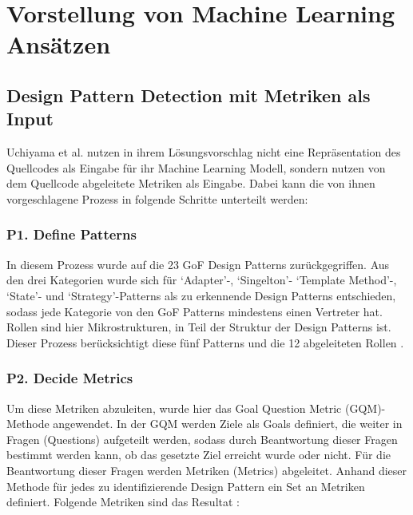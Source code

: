 \documentclass[conference]{IEEEtran}
\begin{document}
\newpage

\section{Vorstellung von Machine Learning Ansätzen}

\subsection{Design Pattern Detection mit Metriken als Input}

Uchiyama et al. nutzen in ihrem Lösungsvorschlag nicht eine Repräsentation des Quellcodes als Eingabe für ihr Machine Learning Modell, sondern nutzen von dem Quellcode abgeleitete Metriken als Eingabe\cite{dodmetrics}.
Dabei kann die von ihnen vorgeschlagene Prozess in folgende Schritte unterteilt werden:


\subsubsection*{P1. Define Patterns}
In diesem Prozess wurde auf die 23 GoF Design Patterns zurückgegriffen. Aus den drei Kategorien wurde sich für `Adapter'-, `Singelton'- `Template Method'-, `State'- und `Strategy'-Patterns als zu erkennende Design Patterns entschieden, sodass jede Kategorie von den GoF Patterns mindestens einen Vertreter hat. Rollen sind hier Mikrostrukturen, in Teil der Struktur der Design Patterns ist. Dieser Prozess berücksichtigt diese fünf Patterns und die 12 abgeleiteten Rollen \cite[p. 4]{dodmetrics}.

\subsubsection*{P2. Decide Metrics}
Um diese Metriken abzuleiten, wurde hier das Goal Question Metric (GQM)-Methode angewendet. In der GQM werden Ziele als Goals definiert, die weiter in Fragen (Questions) aufgeteilt werden, sodass durch Beantwortung dieser Fragen bestimmt werden kann, ob das gesetzte Ziel erreicht wurde oder nicht. Für die Beantwortung dieser Fragen werden Metriken (Metrics) abgeleitet. Anhand dieser Methode für jedes zu identifizierende Design Pattern ein Set an Metriken definiert.
Folgende Metriken sind das Resultat \cite[p. 7]{dodmetrics}:
\end{document}
